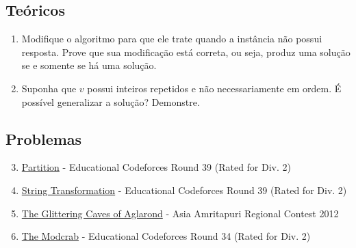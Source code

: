 \subsection*{Teóricos}

\begin{enumerate}
  \item Modifique o algoritmo para que ele trate quando a instância não possui resposta. Prove que sua modificação está correta, ou seja, produz uma solução se e somente se há uma solução.
  \item Suponha que $v$ possui inteiros repetidos e não necessariamente em ordem. É possível generalizar a solução? Demonstre.
\end{enumerate}

\subsection*{Problemas}

\begin{enumerate}
  \setcounter{enumi}{2}
  \item \href{https://codeforces.com/contest/946/problem/A}{Partition} - 
Educational Codeforces Round 39 (Rated for Div. 2)
  \item \href{https://codeforces.com/problemset/problem/946/C}{String Transformation} - Educational Codeforces Round 39 (Rated for Div. 2)
  \item \href{https://icpcarchive.ecs.baylor.edu/index.php?option=com_onlinejudge&Itemid=8&page=show_problem&problem=4356}{The Glittering Caves of Aglarond} - Asia Amritapuri Regional Contest 2012
  \item \href{https://codeforces.com/contest/903/problem/B}{The Modcrab} - Educational Codeforces Round 34 (Rated for Div. 2)
\end{enumerate}

